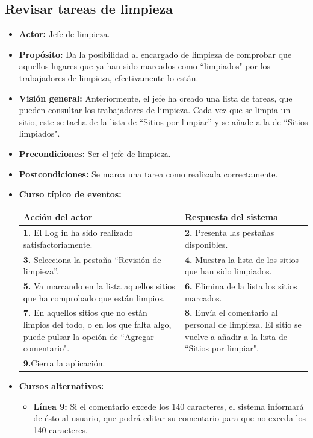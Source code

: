 \documentclass[spanish,a4paper,11pt, twoside]{report}	%
\begin{document}

	\subsection{Revisar tareas de limpieza}
			\begin{itemize}
			\item \textbf{Actor: }Jefe de limpieza.
			\item \textbf{Propósito: }Da la posibilidad al encargado de limpieza de comprobar que aquellos lugares que ya han sido marcados como “limpiados"  por los trabajadores de limpieza, efectivamente lo están.  		
			\item \textbf{Visión general: }Anteriormente, el jefe ha creado una lista de tareas, que pueden consultar los trabajadores de limpieza. Cada vez que se limpia un sitio, este se tacha de la lista de “Sitios por limpiar'' y se añade a la de “Sitios limpiados".  
			\item \textbf{Precondiciones:} Ser el jefe de limpieza.
			\item \textbf{Postcondiciones:} Se marca una tarea como realizada correctamente. 
			\item \textbf{Curso típico de eventos:}\\ 
\begin{tabular}{|p{6cm}||p{6cm}|}
				\hline
				\textbf{Acción del actor} & \textbf{Respuesta del sistema} \\ \hline \hline
				\textbf{1.} El Log in ha sido realizado satisfactoriamente. & \textbf{2.} Presenta las pestañas disponibles.\\ \hline
				\textbf{3.} Selecciona la pestaña “Revisión de limpieza”. & \textbf{4.} Muestra la lista de los sitios que han sido limpiados. \\ \hline
				\textbf{5.} Va marcando en la lista aquellos sitios que ha comprobado que están limpios.	& \textbf{6.} Elimina de la lista los sitios marcados. \\ \hline
				\textbf{7.} En aquellos sitios que no están limpios del todo, o en los que falta algo, puede pulsar la opción de “Agregar comentario". & \textbf{8.} Envía el comentario al personal de limpieza. El sitio se vuelve a añadir a la lista de “Sitios por limpiar".\\ \hline
				\textbf{9.}Cierra la aplicación. & \textbf{} \\ \hline
			\end{tabular}
			\item \textbf{Cursos alternativos:} 
				\begin{itemize}
					\item \textbf{Línea 9: }Si el comentario excede los 140 caracteres, el sistema informará de ésto al usuario, que podrá editar su comentario para que no exceda los 140 caracteres.
				\end{itemize}
		\end {itemize}
\end{document}
